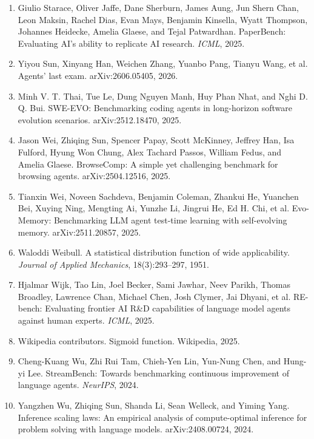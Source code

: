 \begin{enumerate}
\item Giulio Starace, Oliver Jaffe, Dane Sherburn, James Aung, Jun Shern Chan, Leon Maksin, Rachel Dias, Evan Mays, Benjamin Kinsella, Wyatt Thompson, Johannes Heidecke, Amelia Glaese, and Tejal Patwardhan. PaperBench: Evaluating AI's ability to replicate AI research. \textit{ICML}, 2025.

\item Yiyou Sun, Xinyang Han, Weichen Zhang, Yuanbo Pang, Tianyu Wang, et al. Agents' last exam. arXiv:2606.05405, 2026.

\item Minh V. T. Thai, Tue Le, Dung Nguyen Manh, Huy Phan Nhat, and Nghi D. Q. Bui. SWE-EVO: Benchmarking coding agents in long-horizon software evolution scenarios. arXiv:2512.18470, 2025.

\item Jason Wei, Zhiqing Sun, Spencer Papay, Scott McKinney, Jeffrey Han, Isa Fulford, Hyung Won Chung, Alex Tachard Passos, William Fedus, and Amelia Glaese. BrowseComp: A simple yet challenging benchmark for browsing agents. arXiv:2504.12516, 2025.

\item Tianxin Wei, Noveen Sachdeva, Benjamin Coleman, Zhankui He, Yuanchen Bei, Xuying Ning, Mengting Ai, Yunzhe Li, Jingrui He, Ed H. Chi, et al. Evo-Memory: Benchmarking LLM agent test-time learning with self-evolving memory. arXiv:2511.20857, 2025.

\item Waloddi Weibull. A statistical distribution function of wide applicability. \textit{Journal of Applied Mechanics}, 18(3):293--297, 1951.

\item Hjalmar Wijk, Tao Lin, Joel Becker, Sami Jawhar, Neev Parikh, Thomas Broadley, Lawrence Chan, Michael Chen, Josh Clymer, Jai Dhyani, et al. RE-bench: Evaluating frontier AI R\&D capabilities of language model agents against human experts. \textit{ICML}, 2025.

\item Wikipedia contributors. Sigmoid function. Wikipedia, 2025.

\item Cheng-Kuang Wu, Zhi Rui Tam, Chieh-Yen Lin, Yun-Nung Chen, and Hung-yi Lee. StreamBench: Towards benchmarking continuous improvement of language agents. \textit{NeurIPS}, 2024.

\item Yangzhen Wu, Zhiqing Sun, Shanda Li, Sean Welleck, and Yiming Yang. Inference scaling laws: An empirical analysis of compute-optimal inference for problem solving with language models. arXiv:2408.00724, 2024.


\end{enumerate}
